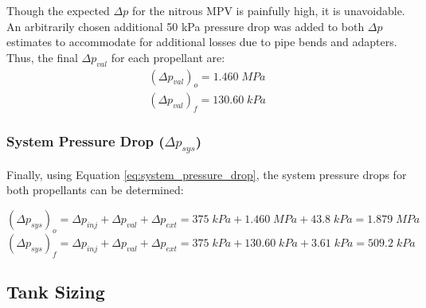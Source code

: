 \documentclass[9pt]{article} %
\numberwithin{equation}{section} %
\begin{document}
Though the expected $\Delta p$ for the nitrous MPV is painfully high, it is unavoidable. An arbitrarily chosen additional 50 kPa pressure drop was added to both $\Delta p$ estimates to accommodate for additional losses due to pipe bends and adapters. Thus, the final $\Delta p_{val}$ for each propellant are:
\begin{align*}
(\Delta p_{val})_{o} = 1.460 \; MPa
\end{align*}
\begin{align*}
(\Delta p_{val})_{f} = 130.60 \; kPa
\end{align*}

\subsubsection{System Pressure Drop ($\Delta p_{sys}$)}

\hspace{\parindent} Finally, using Equation \ref{eq:system_pressure_drop}, the system pressure drops for both propellants can be determined:

\begin{equation} \label{eq:system_pressure_drop_solved_o}
(\Delta p_{sys})_{o} = \Delta p_{inj} + \Delta p_{val} + \Delta p_{ext} = 375 \; kPa + 1.460 \; MPa + 43.8 \; kPa = 1.879 \; MPa
\end{equation}
\begin{equation} \label{eq:system_pressure_drop_solved_f}
(\Delta p_{sys})_{f} = \Delta p_{inj} + \Delta p_{val} + \Delta p_{ext} = 375 \; kPa + 130.60 \; kPa + 3.61 \; kPa = 509.2 \; kPa
\end{equation}

\subsection{Tank Sizing}
\end{document}
